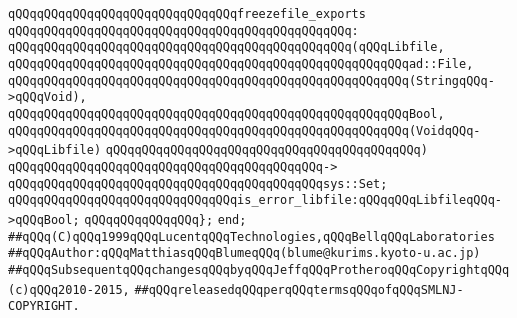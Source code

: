\newline
\newline
\verb|qQQqqQQqqQQqqQQqqQQqqQQqqQQqqQQqfreezefile_exports|\newline
\verb|qQQqqQQqqQQqqQQqqQQqqQQqqQQqqQQqqQQqqQQqqQQqqQQq:|\newline
\verb|qQQqqQQqqQQqqQQqqQQqqQQqqQQqqQQqqQQqqQQqqQQqqQQq(qQQqLibfile,|\newline
\verb|qQQqqQQqqQQqqQQqqQQqqQQqqQQqqQQqqQQqqQQqqQQqqQQqqQQqqQQqad::File,|\newline
\verb|qQQqqQQqqQQqqQQqqQQqqQQqqQQqqQQqqQQqqQQqqQQqqQQqqQQqqQQq(StringqQQq->qQQqVoid),|\newline
\verb|qQQqqQQqqQQqqQQqqQQqqQQqqQQqqQQqqQQqqQQqqQQqqQQqqQQqqQQqBool,|\newline
\verb|qQQqqQQqqQQqqQQqqQQqqQQqqQQqqQQqqQQqqQQqqQQqqQQqqQQqqQQq(VoidqQQq->qQQqLibfile)|\newline
\verb|qQQqqQQqqQQqqQQqqQQqqQQqqQQqqQQqqQQqqQQqqQQq)|\newline
\verb|qQQqqQQqqQQqqQQqqQQqqQQqqQQqqQQqqQQqqQQqqQQq->|\newline
\verb|qQQqqQQqqQQqqQQqqQQqqQQqqQQqqQQqqQQqqQQqqQQqsys::Set;|\newline
\newline
\verb|qQQqqQQqqQQqqQQqqQQqqQQqqQQqqQQqis_error_libfile:qQQqqQQqLibfileqQQq->qQQqBool;|\newline
\verb|qQQqqQQqqQQqqQQq};|\newline
\verb|end;|\newline
\newline
\verb|##qQQq(C)qQQq1999qQQqLucentqQQqTechnologies,qQQqBellqQQqLaboratories|\newline
\verb|##qQQqAuthor:qQQqMatthiasqQQqBlumeqQQq(blume@kurims.kyoto-u.ac.jp)|\newline
\verb|##qQQqSubsequentqQQqchangesqQQqbyqQQqJeffqQQqProtheroqQQqCopyrightqQQq(c)qQQq2010-2015,|\newline
\verb|##qQQqreleasedqQQqperqQQqtermsqQQqofqQQqSMLNJ-COPYRIGHT.|\newline
\newline
\newline

